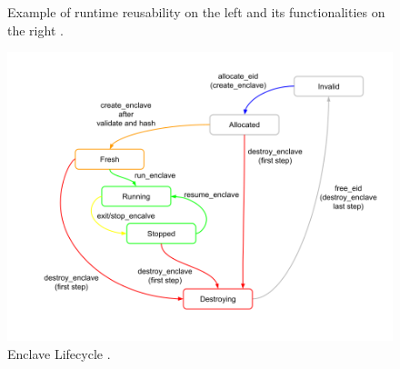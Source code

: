 \begin{figure}[H]
    \centering
    
    \caption{Example of runtime reusability on the left and its functionalities on the right \cite{keystone-doc}.}
    \label{runtime-example}
\end{figure}

\begin{figure}[h!]
    \centering
    \includegraphics[scale=0.45]{./chapters/images/Enclave lifecycle.png}
    \caption{Enclave Lifecycle \cite{keystone-doc}.}
    \label{enclave-lifecycle}
\end{figure}

